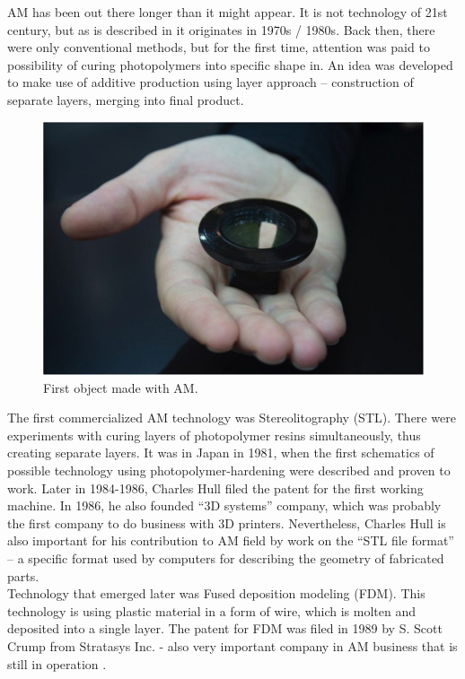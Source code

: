 \documentclass[a4paper, twoside, 11pt]{report}
\begin{document}
	AM has been out there longer than it might appear. It is not technology of 21st century, but as is described in \cite{AMOrigins}it originates in 1970s / 1980s. Back then, there were only conventional methods, but for the first time, attention was paid to possibility of curing photopolymers into specific shape in. An idea was developed to make use of additive production using layer approach – construction of separate layers, merging into final product.
\\
\begin{figure}
 	\includegraphics[width=\textwidth/2]{firstPrintedObject}
	\caption{First object made with AM.}
\end{figure}

	The first commercialized AM technology was Stereolitography (STL). There were experiments with curing layers of photopolymer resins simultaneously, thus creating separate layers. It was in Japan in 1981, when the first schematics of possible technology using photopolymer-hardening were described and proven to work. Later in 1984-1986, Charles Hull filed the patent for the first working machine\cite{FirstPatent}.
In 1986, he also founded “3D systems” company, which was probably the first company to do business with 3D printers. Nevertheless, Charles Hull is also important for his contribution to AM field by work on the “STL file format” – a specific format used by computers for describing the geometry of fabricated parts.\\
Technology that emerged later was Fused deposition modeling (FDM). This technology is using plastic material in a form of wire, which is molten and deposited into a single layer. The patent for FDM was filed in 1989 by S. Scott Crump from Stratasys Inc.  - also very important company in AM business that is still in operation \cite{CrumpPatent}.
\end{document}
